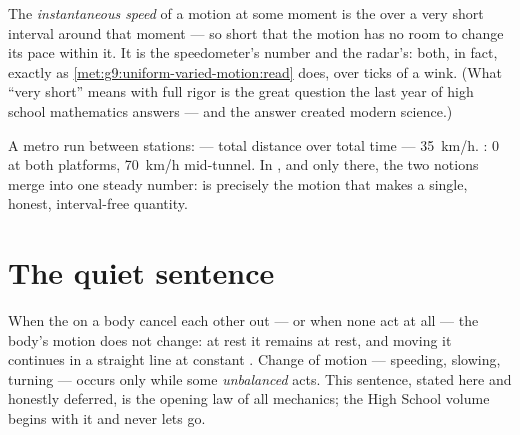 \begin{definition}\label{def:g9:uniform-varied-motion:instant}
The \emph{instantaneous speed} of
a motion at some moment is the  over a very
short interval around that moment --- so short that the
motion has no room to change its pace within it. It is the
speedometer's number and the radar's: both, in fact, 
exactly as \cref{met:g9:uniform-varied-motion:read} does,
over ticks of a wink. (What ``very short'' means with full
rigor is the great question the last year of high school
mathematics answers --- and the answer created modern
science.)
\end{definition}

\begin{example}\label{ex:g9:uniform-varied-motion:sidebyside}
A metro run between stations:  --- total
distance over total time --- \qty{35}{km/h}. : $0$ at both platforms, \qty{70}{km/h} mid-tunnel. In
, and only there, the two notions merge into
one steady number:  is precisely the motion
that makes  a single, honest, interval-free quantity.
\end{example}

\section{The quiet sentence}

\begin{proposition}\label{prop:g9:uniform-varied-motion:inertia}
When the  on a body cancel each other out --- or when
none act at all --- the body's motion does not change: at
rest it remains at rest, and moving it continues in a
straight line at constant . Change of motion ---
speeding, slowing, turning --- occurs only while some
\emph{unbalanced}  acts. This sentence, stated here and
honestly deferred, is the opening law of all mechanics; the
High School volume begins with it and never lets go.
\end{proposition}

